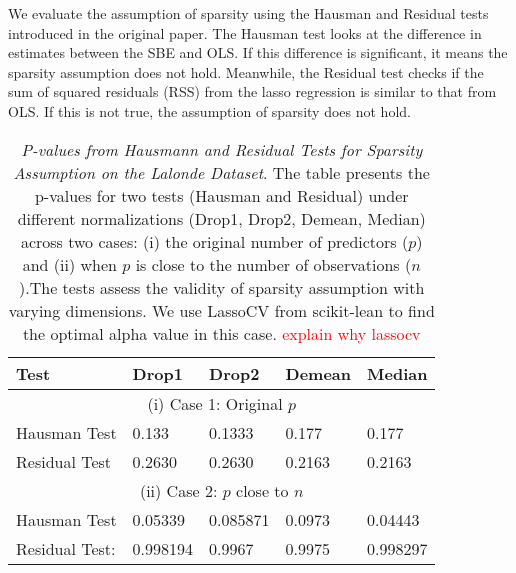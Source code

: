 We evaluate the assumption of sparsity using the Hausman and Residual tests introduced in the original paper. The Hausman test looks at the difference in estimates between the SBE and OLS. If this difference is significant, it means the sparsity assumption does not hold. Meanwhile, the Residual test checks if the sum of squared residuals (RSS) from the lasso regression is similar to that from OLS. If this is not true, the assumption of sparsity does not hold. 

\begin{table}[h!]
\renewcommand{\arraystretch}{1.5}
\centering
\begin{tabular}{||l l l l l||} 
 \hline
 \hline
 Test & Drop1 & Drop2 &  Demean & Median \\ [0.5ex] 
 \hline \hline
 \multicolumn{5}{||c||}{(i) Case 1: Original $p$} \\ [0.5ex]
 Hausman Test & 0.133 & 0.1333 & 0.177 & 0.177 \\ 
 Residual Test & 0.2630 & 0.2630 & 0.2163 & 0.2163 \\
 \hline
 \multicolumn{5}{||c||}{(ii) Case 2: $p$ close to $n$} \\ [0.5ex]
 Hausman Test & 0.05339 & 0.085871 & 0.0973 & 0.04443 \\ 
 Residual Test: & 0.998194 & 0.9967  & 0.9975 & 0.998297 \\ [1ex] 
 \hline \hline
\end{tabular}
\caption{\textit{P-values from Hausmann and Residual Tests for Sparsity Assumption on the Lalonde Dataset}. The table presents the p-values for two tests (Hausman and Residual) under different normalizations (Drop1, Drop2, Demean, Median) across two cases: (i) the original number of predictors ($p$) and (ii) when $p$ is close to the number of observations ($n$).The tests assess the validity of sparsity assumption with varying dimensions. We use LassoCV from scikit-lean to find the optimal alpha value in this case. \textcolor{red}{explain why lassocv}}


\label{table:1}
\end{table}

